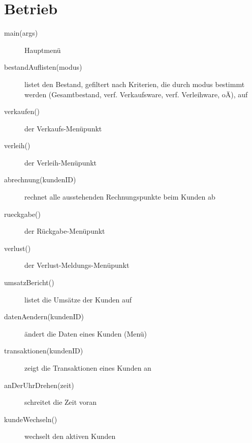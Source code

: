 \documentclass[a4paper,12pt,titlepage]{article}
\begin{document}
\section{Betrieb}
\begin{description}
\item[main(args)]
Hauptmenü
\item[bestandAuflisten(modus)]
listet den Bestand, gefiltert nach Kriterien, die durch modus bestimmt werden (Gesamtbestand, verf. Verkaufsware, verf. Verleihware, oÄ), auf
\item[verkaufen()]
der Verkaufs-Menüpunkt
\item[verleih()]
der Verleih-Menüpunkt
\item[abrechnung(kundenID)]
rechnet alle ausstehenden Rechnungspunkte beim Kunden ab
\item[rueckgabe()]
der Rückgabe-Menüpunkt
\item[verlust()]
der Verlust-Meldungs-Menüpunkt
\item[umsatzBericht()]
listet die Umsätze der Kunden auf
\item[datenAendern(kundenID)]
ändert die Daten eines Kunden (Menü)
\item[transaktionen(kundenID)]
zeigt die Transaktionen eines Kunden an
\item[anDerUhrDrehen(zeit)]
schreitet die Zeit voran
\item[kundeWechseln()]
wechselt den aktiven Kunden
\end{description}
\end{document}
